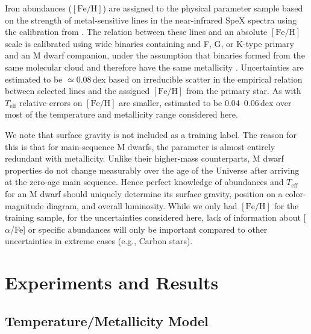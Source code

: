 \documentclass[twocolumn]{aastex62}
\newcommand{\teff}{T_{\mathrm{eff}}}
\newcommand{\feh}{[{\mathrm{Fe}/\mathrm{H}}]}
\begin{document}
Iron abundances ($\feh$) are assigned to the physical parameter sample based on the strength of metal-sensitive lines in the near-infrared SpeX spectra \citep{RojasAyala:2010} using the calibration from \citet{Mann:2013a}. The relation between these lines and an absolute $\feh$ scale is calibrated using wide binaries containing and F, G, or K-type primary and an M dwarf companion, under the assumption that binaries formed from the same molecular cloud and therefore have the same metallicity \citep{Bonfils:2005}. Uncertainties are estimated to be $\simeq$0.08\,dex based on irreducible scatter in the empirical relation between selected lines and the assigned $\feh$ from the primary star. As with $\teff$ relative errors on $\feh$ are smaller, estimated to be 0.04--0.06\,dex over most of the temperature and metallicity range considered here.

We note that surface gravity is not included as a training label. The reason for this is that for main-sequence M dwarfs, the parameter is almost entirely redundant with metallicity. Unlike their higher-mass counterparts, M dwarf properties do not change measurably over the age of the Universe after arriving at the zero-age main sequence. Hence perfect knowledge of abundances and $\teff$ for an M dwarf should uniquely determine its surface gravity, position on a color-magnitude diagram, and overall luminosity. While we only had $\feh$ for the training sample, for the uncertainties considered here, lack of information about [$\alpha$/Fe] or specific abundances will only be important compared to other uncertainties in extreme cases (e.g., Carbon stars).  \\



\section{Experiments and Results} \label{sec:results}

\subsection{Temperature/Metallicity Model \label{subsec:mann_results}}
\end{document}
